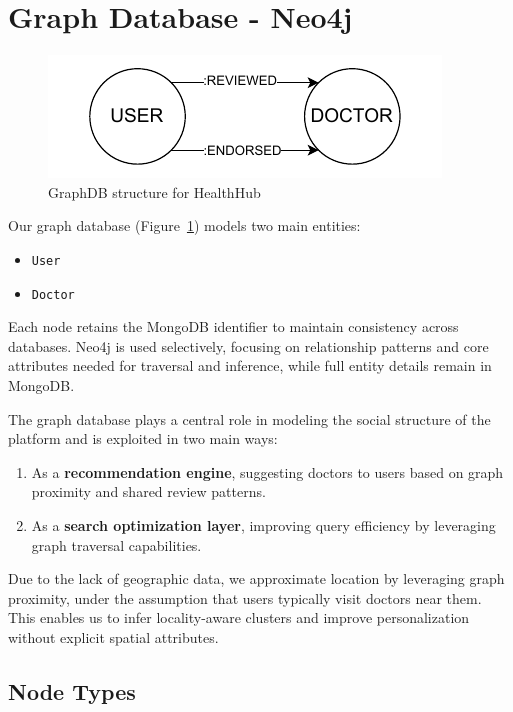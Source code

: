 \section{Graph Database - Neo4j}

\begin{figure}[!ht]
    \centering
    \includegraphics[scale=1.7]{./resources/neo4j.pdf}
    \caption{GraphDB structure for HealthHub}
    \label{fig:neo4j-structure}
\end{figure}

Our graph database (Figure~\ref{fig:neo4j-structure}) models two main entities:

\begin{itemize}
  \item \texttt{User}
  \item \texttt{Doctor}
\end{itemize}

Each node retains the MongoDB identifier to maintain consistency across databases. Neo4j is used selectively, focusing on relationship patterns and core attributes needed for traversal and inference, while full entity details remain in MongoDB.

The graph database plays a central role in modeling the social structure of the platform and is exploited in two main ways:
\begin{enumerate}
  \item As a \textbf{recommendation engine}, suggesting doctors to users based on graph proximity and shared review patterns.
  \item As a \textbf{search optimization layer}, improving query efficiency by leveraging graph traversal capabilities.
\end{enumerate}

Due to the lack of geographic data, we approximate location by leveraging graph proximity, under the assumption that users typically visit doctors near them. This enables us to infer locality-aware clusters and improve personalization without explicit spatial attributes.

\subsection{Node Types}

